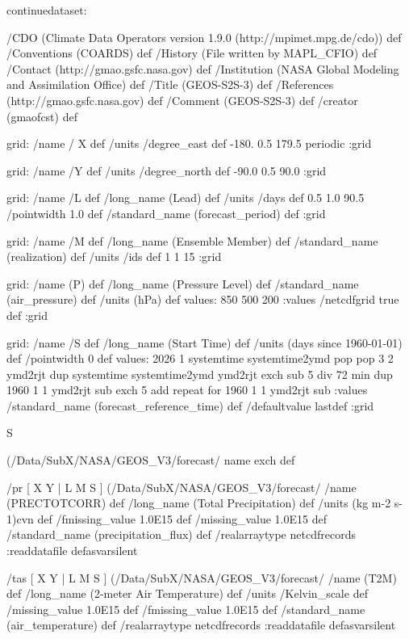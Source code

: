 \begin{ingrid}
continuedataset:

 /CDO (Climate Data Operators version 1.9.0 (http://mpimet.mpg.de/cdo)) def
 /Conventions (COARDS) def
 /History (File written by MAPL_CFIO) def
 /Contact (http://gmao.gsfc.nasa.gov) def
 /Institution (NASA Global Modeling and Assimilation Office) def
 /Title (GEOS-S2S-3) def
 /References (http://gmao.gsfc.nasa.gov) def
 /Comment (GEOS-S2S-3) def
 /creator (gmaofcst) def

grid:
/name / X def
/units /degree_east def
 -180. 0.5 179.5
periodic
:grid

grid:
/name /Y def
/units /degree_north def
 -90.0 0.5 90.0
:grid

grid:
/name /L def
/long_name (Lead) def
/units /days def
 0.5 1.0 90.5
/pointwidth 1.0 def
/standard_name (forecast_period) def
:grid

grid:
/name /M def
/long_name (Ensemble Member) def
/standard_name (realization) def
/units /ids def
1 1 15
:grid

grid:
/name (P) def
/long_name (Pressure Level) def
/standard_name (air_pressure) def
/units (hPa) def
values: 850 500 200 :values
/netcdfgrid true def
:grid

grid:
/name /S def
/long_name (Start Time) def
/units (days since 1960-01-01) def
/pointwidth 0 def
values:
  2026 1 systemtime systemtime2ymd pop
     pop
    { %
      3 2 ymd2rjt dup
      systemtime systemtime2ymd ymd2rjt exch sub 5 div 72 min {
        dup 1960 1 1 ymd2rjt sub
        exch 5 add
      } repeat
    }for
    1960 1 1 ymd2rjt sub
:values
/standard_name (forecast_reference_time) def
/defaultvalue {last}def
:grid

S {(/Data/SubX/NASA/GEOS_V3/forecast/%
name exch def

 /pr{
[ X Y | L M S ] (/Data/SubX/NASA/GEOS_V3/forecast/%
/name (PRECTOTCORR) def
 /long_name (Total Precipitation) def
 /units (kg m-2 s-1)cvn def
 /fmissing_value 1.0E15 def
 /missing_value 1.0E15 def
 /standard_name (precipitation_flux) def
 /realarraytype netcdfrecords :readdatafile
}defasvarsilent

 /tas{
[ X Y | L M S ] (/Data/SubX/NASA/GEOS_V3/forecast/%
/name (T2M) def
 /long_name (2-meter Air Temperature) def
 /units /Kelvin_scale def
 /missing_value 1.0E15 def
 /fmissing_value 1.0E15 def
 /standard_name (air_temperature) def
 /realarraytype netcdfrecords :readdatafile
}defasvarsilent

}
\end{ingrid}
